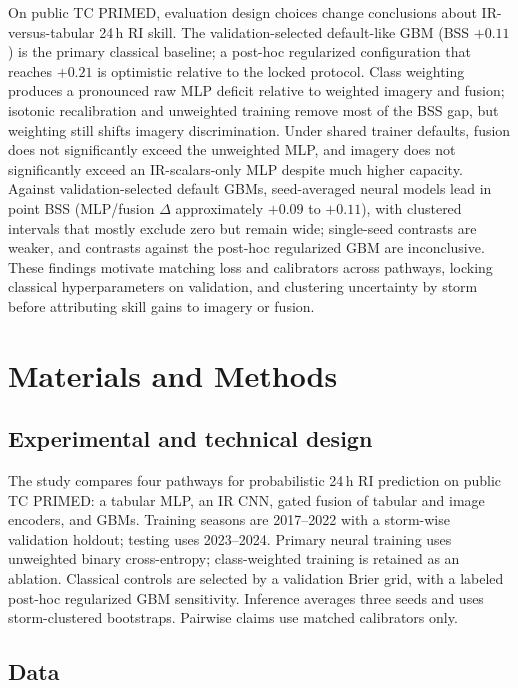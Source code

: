 \documentclass[11pt]{article}
\begin{document}
On public {TC PRIMED}, evaluation design choices change conclusions about IR-versus-tabular 24\,h RI skill. The validation-selected default-like GBM (BSS $+0.11$) is the primary classical baseline; a post-hoc regularized configuration that reaches $+0.21$ is optimistic relative to the locked protocol. Class weighting produces a pronounced raw MLP deficit relative to weighted imagery and fusion; isotonic recalibration and unweighted training remove most of the BSS gap, but weighting still shifts imagery discrimination. Under shared trainer defaults, fusion does not significantly exceed the unweighted MLP, and imagery does not significantly exceed an IR-scalars-only MLP despite much higher capacity. Against validation-selected default GBMs, seed-averaged neural models lead in point BSS (MLP/fusion $\Delta$ approximately $+0.09$ to $+0.11$), with clustered intervals that mostly exclude zero but remain wide; single-seed contrasts are weaker, and contrasts against the post-hoc regularized GBM are inconclusive. These findings motivate matching loss and calibrators across pathways, locking classical hyperparameters on validation, and clustering uncertainty by storm before attributing skill gains to imagery or fusion.

\section{Materials and Methods}
\label{sec:methods}

\subsection{Experimental and technical design}

The study compares four pathways for probabilistic 24\,h RI prediction on public {TC PRIMED}: a tabular MLP, an IR CNN, gated fusion of tabular and image encoders, and GBMs. Training seasons are 2017--2022 with a storm-wise validation holdout; testing uses 2023--2024. Primary neural training uses unweighted binary cross-entropy; class-weighted training is retained as an ablation. Classical controls are selected by a validation Brier grid, with a labeled post-hoc regularized GBM sensitivity. Inference averages three seeds and uses storm-clustered bootstraps. Pairwise claims use matched calibrators only.

\subsection{Data}
\end{document}
